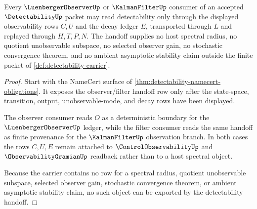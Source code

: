 \begin{theorem}
\label{thm:detectability-observer-boundary}
Every $\LuenbergerObserverUp$ or $\KalmanFilterUp$ consumer of an accepted $\DetectabilityUp$ packet may read detectability only through the displayed observability rows $C,U$ and the decay ledger $E$, transported through $L$ and replayed through $H,T,P,N$. The handoff supplies no host spectral radius, no quotient unobservable subspace, no selected observer gain, no stochastic convergence theorem, and no ambient asymptotic stability claim outside the finite packet of \autoref{def:detectability-carrier}.
\end{theorem}
\begin{proof}
Start with the NameCert surface of \autoref{thm:detectability-namecert-obligations}. It exposes the observer/filter handoff row only after the state-space, transition, output, unobservable-mode, and decay rows have been displayed.

The observer consumer reads $O$ as a deterministic boundary for the $\LuenbergerObserverUp$ ledger, while the filter consumer reads the same handoff as finite provenance for the $\KalmanFilterUp$ observation branch. In both cases the rows $C,U,E$ remain attached to $\ControlObservabilityUp$ and $\ObservabilityGramianUp$ readback rather than to a host spectral object.

Because the carrier contains no row for a spectral radius, quotient unobservable subspace, selected observer gain, stochastic convergence theorem, or ambient asymptotic stability claim, no such object can be exported by the detectability handoff.
\end{proof}




